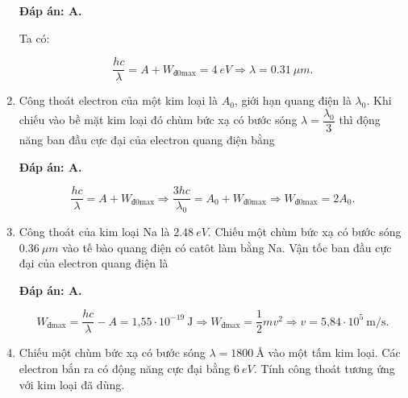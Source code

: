 \begin{enumerate}[label=\bfseries Câu \arabic*:]
{		
	}
	
	\loigiai
	{		\textbf{Đáp án: A.}
		
		Ta có:
		
		$$\dfrac{hc}{\lambda} = A + W_\text{đ0max} = \SI{4}{eV} \Rightarrow \lambda = \SI{0,31}{\mu m}.$$
	}
		\item {} 
	\cauhoi
	{Công thoát electron của một kim loại là $A_0$, giới hạn quang điện là $\lambda_0$. Khi chiếu vào bề mặt kim loại đó chùm bức xạ có bước sóng $\lambda = \dfrac{\lambda_0}{3}$ thì động năng ban đầu cực đại của electron quang điện bằng
	}
	
	\loigiai
	{		\textbf{Đáp án: A.}
		
		$$ \dfrac{hc}{\lambda} = A + W_\text{đ0max} \Rightarrow \dfrac{3hc}{\lambda_0} = A_0 + W_\text{đ0max} \Rightarrow W_\text{đ0max} = 2A_0.$$
	}
	\item {} 
	\cauhoi
	{
		Công thoát của kim loại Na là $\SI{2,48}{eV}$. Chiếu một chùm bức xạ có bước sóng $\SI{0,36}{\mu m}$  vào tế bào quang điện có catôt làm bằng Na. Vận tốc ban đầu cực đại của electron quang điện là
		
	}
	
	\loigiai
	{		\textbf{Đáp án: A.}
		
		$$W_\text{đmax} = \dfrac{hc}{\lambda} - A = \text{1,55}\cdot 10^{-19}\ \text{J} \Rightarrow W_\text{đmax} = \dfrac{1}{2}mv^2 \Rightarrow v = \text{5,84} \cdot 10^5\ \text{m/s}.$$
	}
	\item {} 
	\cauhoi
	{Chiếu một chùm bức xạ có bước sóng $\lambda = \SI{1800}{\angstrom}$ vào một tấm kim loại. Các electron bắn ra có động năng cực đại bằng $\SI{6}{eV}$. Tính công thoát tương ứng với kim loại đã dùng.
	
}
\end{enumerate}

